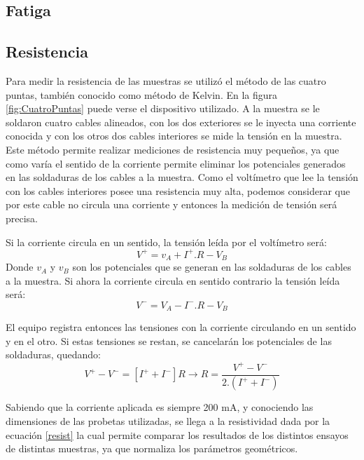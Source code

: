 \documentclass[a4paper,12pt,fleqn,twoside,openany]{book}
\begin{document}
 
 
\subsection{Fatiga}

\subsection{Resistencia}


Para medir la resistencia de las muestras se utilizó el método de las cuatro puntas, también conocido como método de Kelvin. En la figura 
\ref{fig:CuatroPuntas} puede 
verse el dispositivo utilizado. A la muestra se le soldaron cuatro cables alineados, con los dos exteriores se le inyecta una corriente conocida y con los 
otros dos cables interiores se mide la tensión en la muestra. Este método permite realizar mediciones de resistencia muy pequeños, ya que como varía
el sentido de la corriente permite eliminar los potenciales generados en las soldaduras de los cables a la muestra.
Como el voltímetro que lee la tensión con los cables interiores posee una resistencia muy alta, podemos considerar que por este cable no circula una corriente
y entonces la medición de tensión será precisa. 

Si la corriente circula en un sentido, la tensión leída por el voltímetro será:
\begin{equation}
 V^+= v_A +I^+ . R - V_B 
\end{equation}
Donde $v_A$ y $v_B$ son los potenciales que se generan en las soldaduras de los cables a la muestra. Si ahora la corriente circula en sentido contrario la tensión leída será:
\begin{equation}
 V^-= V_A -I^- . R - V_B 
\end{equation}

El equipo registra entonces las tensiones con la corriente circulando en un sentido y en el otro. Si estas tensiones se restan, se cancelarán los potenciales 
de las soldaduras, quedando:  
\begin{equation}
 V^+ - V^-= [I^+ + I^-] R \longrightarrow R=\frac{V^+ - V^-}{2.(I^+ + I^-)}
\end{equation}

Sabiendo que la corriente aplicada es siempre 200 mA, y conociendo las dimensiones de las probetas utilizadas, se llega a la resistividad dada por la 
ecuación \ref{resist} la cual permite comparar los resultados de los distintos ensayos de distintas muestras, ya que normaliza los parámetros geométricos.
\end{document}
